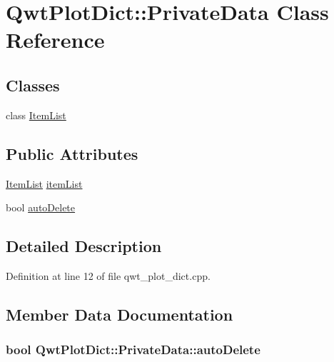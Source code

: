 \hypertarget{class_qwt_plot_dict_1_1_private_data}{\section{Qwt\-Plot\-Dict\-:\-:Private\-Data Class Reference}
\label{class_qwt_plot_dict_1_1_private_data}
}
\subsection*{Classes}
\begin{DoxyCompactItemize}
\item 
class \hyperlink{class_qwt_plot_dict_1_1_private_data_1_1_item_list}{Item\-List}
\end{DoxyCompactItemize}
\subsection*{Public Attributes}
\begin{DoxyCompactItemize}
\item 
\hyperlink{class_qwt_plot_dict_1_1_private_data_1_1_item_list}{Item\-List} \hyperlink{class_qwt_plot_dict_1_1_private_data_a5a5ae90ad0617a13bf1f523bb967fa31}{item\-List}
\item 
bool \hyperlink{class_qwt_plot_dict_1_1_private_data_abb059089a33043db00ea93ba74c23850}{auto\-Delete}
\end{DoxyCompactItemize}


\subsection{Detailed Description}


Definition at line 12 of file qwt\-\_\-plot\-\_\-dict.\-cpp.



\subsection{Member Data Documentation}
\hypertarget{class_qwt_plot_dict_1_1_private_data_abb059089a33043db00ea93ba74c23850}{
\subsubsection[{auto\-Delete}]{\setlength{\rightskip}{0pt plus 5cm}bool Qwt\-Plot\-Dict\-::\-Private\-Data\-::auto\-Delete}}\label{class_qwt_plot_dict_1_1_private_data_abb059089a33043db00ea93ba74c23850}


